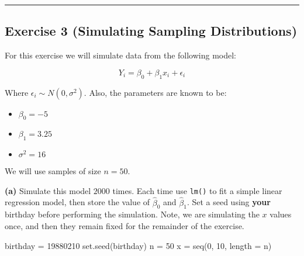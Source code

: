 \documentclass[
]{article}
\newenvironment{Shaded}{\begin{snugshade}}{\end{snugshade}}
\newcommand{\AttributeTok}[1]{\textcolor[rgb]{0.77,0.63,0.00}{#1}}
\newcommand{\DecValTok}[1]{\textcolor[rgb]{0.00,0.00,0.81}{#1}}
\newcommand{\FunctionTok}[1]{\textcolor[rgb]{0.00,0.00,0.00}{#1}}
\newcommand{\NormalTok}[1]{#1}
\newcommand{\OtherTok}[1]{\textcolor[rgb]{0.56,0.35,0.01}{#1}}
\providecommand{\tightlist}{%
  \setlength{\itemsep}{0pt}\setlength{\parskip}{0pt}}
\begin{document}
\begin{center}\rule{0.5\linewidth}{0.5pt}\end{center}

\hypertarget{exercise-3-simulating-sampling-distributions}{%
\subsection{Exercise 3 (Simulating Sampling
Distributions)}\label{exercise-3-simulating-sampling-distributions}}

For this exercise we will simulate data from the following model:

\[
Y_i = \beta_0 + \beta_1 x_i + \epsilon_i
\]

Where \(\epsilon_i \sim N(0, \sigma^2).\) Also, the parameters are known
to be:

\begin{itemize}
\tightlist
\item
  \(\beta_0 = -5\)
\item
  \(\beta_1 = 3.25\)
\item
  \(\sigma^2 = 16\)
\end{itemize}

We will use samples of size \(n = 50\).

\textbf{(a)} Simulate this model \(2000\) times. Each time use
\texttt{lm()} to fit a simple linear regression model, then store the
value of \(\hat{\beta}_0\) and \(\hat{\beta}_1\). Set a seed using
\textbf{your} birthday before performing the simulation. Note, we are
simulating the \(x\) values once, and then they remain fixed for the
remainder of the exercise.

\begin{Shaded}
\begin{Highlighting}[]
\NormalTok{birthday }\OtherTok{=} \DecValTok{19880210}
\FunctionTok{set.seed}\NormalTok{(birthday)}
\NormalTok{n }\OtherTok{=} \DecValTok{50}
\NormalTok{x }\OtherTok{=} \FunctionTok{seq}\NormalTok{(}\DecValTok{0}\NormalTok{, }\DecValTok{10}\NormalTok{, }\AttributeTok{length =}\NormalTok{ n)}
\end{Highlighting}
\end{Shaded}
\end{document}
